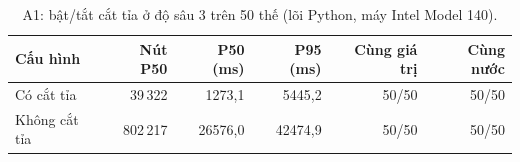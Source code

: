 \begin{table}[H]
  \centering\small
  \caption{A1: bật/tắt cắt tỉa ở độ sâu 3 trên 50 thế (lõi Python, máy Intel Model 140).}
  \label{tab:a1}
  \setlength{\tabcolsep}{4pt}
  \begin{tabular}{@{}lrrrrr@{}}
    \toprule
    Cấu hình & Nút P50 & P50 (ms) & P95 (ms) & Cùng giá trị & Cùng nước \\
    \midrule
    Có cắt tỉa & 39\,322 & 1273{,}1 & 5445{,}2 & 50/50 & 50/50 \\
    Không cắt tỉa & 802\,217 & 26576{,}0 & 42474{,}9 & 50/50 & 50/50 \\
    \bottomrule
  \end{tabular}
\end{table}
